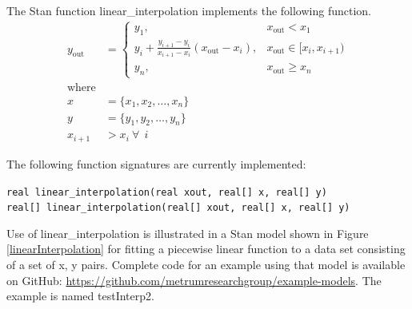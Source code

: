 \documentclass[11pt]{amsart}
\begin{document}
The Stan function linear\_interpolation implements the following function.
\begin{align*}
  y_\text{out}  &= \left\{\begin{array}{ll}
                 y_1, & x_\text{out} < x_1 \\
                 y_i + \frac{y_{i+1} - y_i}{x_{i+1} - x_i}
                 \left(x_\text{out} - x_i\right), & x_\text{out} \in [x_i, x_{i+1}) \\
                 y_n, & x_\text{out} \ge x_n 
                          \end{array} \right. \\
\text{where} \\
x &= \{x_1, x_2, \ldots, x_n\} \\
y &= \{y_1, y_2, \ldots, y_n\} \\
x_{i+1} &> x_i\ \forall\ \ i
\end{align*}

The following function signatures are currently implemented:

{\tt real linear\_interpolation(real xout, real[] x, real[] y)} \\
{\tt real[] linear\_interpolation(real[] xout, real[] x, real[]
  y)} 

Use of linear\_interpolation is illustrated in a Stan model shown in
Figure \ref{linearInterpolation} for fitting a piecewise linear
function to a data set consisting of a set of x, y pairs. Complete
code for an example using that model is available on GitHub:
\url{https://github.com/metrumresearchgroup/example-models}. The
example is named testInterp2.
\end{document}
